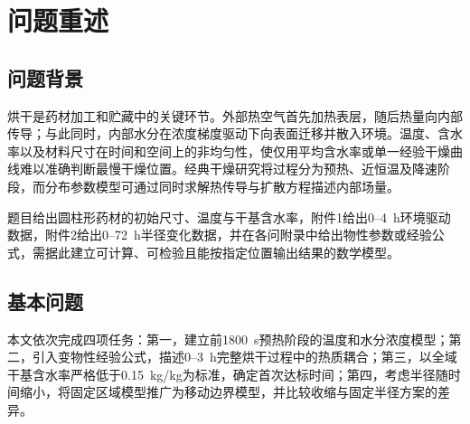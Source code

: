 \documentclass[UTF8,a4paper,zihao=-4,fontset=fandol]{ctexart}
\newcommand{\blankcontent}{\par\noindent\strut\par}
\begin{document}
\section{问题重述}
\label{sec:restatement}
\subsection{问题背景}
烘干是药材加工和贮藏中的关键环节。外部热空气首先加热表层，随后热量向内部传导；与此同时，内部水分在浓度梯度驱动下向表面迁移并散入环境。温度、含水率以及材料尺寸在时间和空间上的非均匀性，使仅用平均含水率或单一经验干燥曲线难以准确判断最慢干燥位置。经典干燥研究将过程分为预热、近恒温及降速阶段\cite{lewis1921}，而分布参数模型可通过同时求解热传导与扩散方程描述内部场量\cite{pumpkin2017}。

题目给出圆柱形药材的初始尺寸、温度与干基含水率，附件1给出0--4~h环境驱动数据，附件2给出0--72~h半径变化数据，并在各问附录中给出物性参数或经验公式，需据此建立可计算、可检验且能按指定位置输出结果的数学模型。
\subsection{基本问题}
本文依次完成四项任务：第一，建立前1800~s预热阶段的温度和水分浓度模型；第二，引入变物性经验公式，描述0--3~h完整烘干过程中的热质耦合；第三，以全域干基含水率严格低于0.15~kg/kg为标准，确定首次达标时间；第四，考虑半径随时间缩小，将固定区域模型推广为移动边界模型，并比较收缩与固定半径方案的差异。
\end{document}
